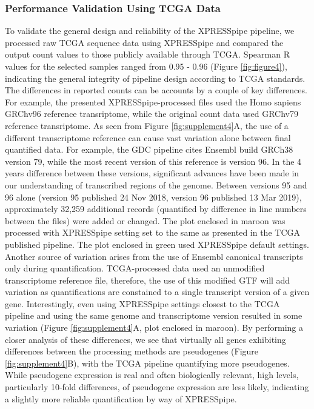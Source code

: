 \documentclass[11pt, a4paper, oneside]{article}
\begin{document}
\subsubsection{Performance Validation Using TCGA Data}
To validate the general design and reliability of the XPRESSpipe pipeline, we processed raw TCGA sequence data using XPRESSpipe and compared the output count values to those publicly available through TCGA. Spearman R values for the selected samples ranged from 0.95 - 0.96 (Figure \ref{fig:figure4}), indicating the general integrity of pipeline design according to TCGA standards. The differences in reported counts can be accounts by a couple of key differences. For example, the presented XPRESSpipe-processed files used the Homo sapiens GRChv96 reference transriptome, while the original count data used GRChv79 reference transriptome. As seen from Figure \ref{fig:supplement4}A, the use of a different transcriptome reference can cause vast variation alone between final quantified data. For example, the GDC pipeline cites Ensembl build GRCh38 version 79, while the most recent version of this reference is version 96. In the 4 years difference between these versions, significant advances have been made in our understanding of transcribed regions of the genome. Between versions 95 and 96 alone (version 95 published 24 Nov 2018, version 96 published 13 Mar 2019), approximately 32,259 additional records (quantified by difference in line numbers between the files) were added or changed. The plot enclosed in maroon was processed with XPRESSpipe setting set to the same as presented in the TCGA published pipeline. The plot enclosed in green used XPRESSpipe default settings. Another source of variation arises from the use of Ensembl canonical transcripts only during quantification. TCGA-processed data used an unmodified transcriptome reference file, therefore, the use of this modified GTF will add variation as quantifications are constained to a single transcript version of a given gene. Interestingly, even using XPRESSpipe settings closest to the TCGA pipeline and using the same genome and transcriptome version resulted in some variation (Figure \ref{fig:supplement4}A, plot enclosed in maroon). By performing a closer analysis of these differences, we see that virtually all genes exhibiting differences between the processing methods are pseudogenes (Figure \ref{fig:supplement4}B), with the TCGA pipeline quantifying more pseudogenes. While pseudogene expression is real and often biologically relevant, high levels, particularly 10-fold differences, of pseudogene expression are less likely, indicating a slightly more reliable quantification by way of XPRESSpipe.
\end{document}
